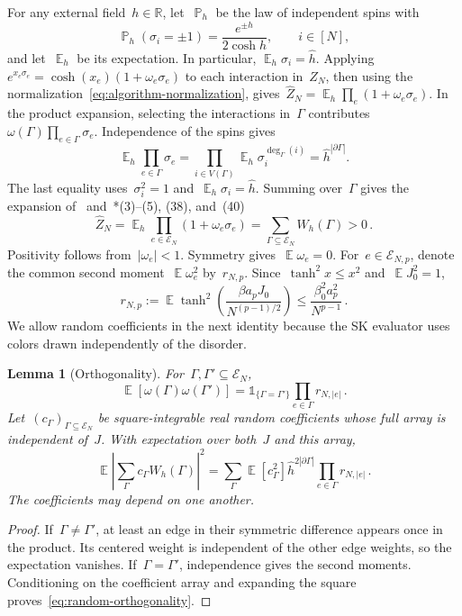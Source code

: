 \documentclass[letterpaper,11pt,reqno]{amsart}
\renewcommand{\leq}{\leqslant}
\newcommand{\ind}{\mathds{1}}
\DeclareMathOperator{\E}{\mathds{E}}
\DeclareMathOperator{\pr}{\mathds{P}}
\newcommand{\hh}{\hat{h}}
\newtheorem{lemma}[theorem]{Lemma}
\begin{document}
For any external field~$h\in\mathbb R$, let~$\pr_h$ be the law of independent spins with
\begin{equation*}
\pr_h(\sigma_i=\pm1)=\frac{e^{\pm h}}{2\cosh h},\qquad i\in[N],
\end{equation*}
and let~$\E_h$ be its expectation. In particular, $\E_h\sigma_i=\hh$.  Applying~$e^{x_e\sigma_e}=\cosh(x_e)(1+\omega_e\sigma_e)$ to each interaction in~$Z_N$, then using the normalization~\eqref{eq:algorithm-normalization}, gives~$\widehat Z_N=\E_h\prod_e(1+\omega_e\sigma_e)$. In the product expansion, selecting the interactions in~$\Gamma$ contributes~$\omega(\Gamma)\prod_{e\in\Gamma}\sigma_e$. Independence of the spins gives
\begin{equation*}
\E_h\prod_{e\in\Gamma}\sigma_e
=\prod_{i\in V(\Gamma)}\E_h\sigma_i^{\deg_\Gamma(i)}
=\hh^{|\partial\Gamma|}.
\end{equation*}
The last equality uses~$\sigma_i^2=1$ and~$\E_h\sigma_i=\hh$. Summing over~$\Gamma$ gives the expansion of~\cite{DW23} and~\cite{DW26}*{(3)--(5), (38), and~(40)}
\begin{equation}\label{eq:algorithm-expansion}
\widehat Z_N=\E_h\prod_{e\in\mathcal E_N}(1+\omega_e\sigma_e)
=\sum_{\Gamma\subseteq\mathcal E_N}W_h(\Gamma)>0\,.
\end{equation}
Positivity follows from~$|\omega_e|<1$. Symmetry gives~$\E\omega_e=0$. For~$e\in\mathcal E_{N,p}$, denote the common second moment~$\E\omega_e^2$ by~$r_{N,p}$. Since~$\tanh^2x\leq x^2$ and~$\E J_0^2=1$,
\begin{equation}\label{eq:edge-second-moment}
r_{N,p}:=\E\tanh^2\!\left(\frac{\beta a_pJ_0}{N^{(p-1)/2}}\right)
\leq\frac{\beta_0^2a_p^2}{N^{p-1}}\,.
\end{equation}
We allow random coefficients in the next identity because the SK evaluator uses colors drawn independently of the disorder.

\begin{lemma}[Orthogonality]\label{lem:orthogonality}
For~$\Gamma,\Gamma'\subseteq\mathcal E_N$,
\begin{equation}\label{eq:orthogonality}
\E[\omega(\Gamma)\omega(\Gamma')]=\ind_{\{\Gamma=\Gamma'\}}\prod_{e\in\Gamma}r_{N,|e|}\,.
\end{equation}
Let~$(c_\Gamma)_{\Gamma\subseteq\mathcal E_N}$ be square-integrable real random coefficients whose full array is independent of~$J$. With expectation over both~$J$ and this array,
\begin{equation}\label{eq:random-orthogonality}
\E\left|\sum_\Gamma c_\Gamma W_h(\Gamma)\right|^2
=\sum_\Gamma\E[c_\Gamma^2]\hh^{2|\partial\Gamma|}\prod_{e\in\Gamma}r_{N,|e|}\,.
\end{equation}
The coefficients may depend on one another.
\end{lemma}
\begin{proof}
If~$\Gamma\ne\Gamma'$, at least an edge in their symmetric difference appears once in the product. Its centered weight is independent of the other edge weights, so the expectation vanishes. If~$\Gamma=\Gamma'$, independence gives the second moments. Conditioning on the coefficient array and expanding the square proves~\eqref{eq:random-orthogonality}.
\end{proof}
\end{document}
